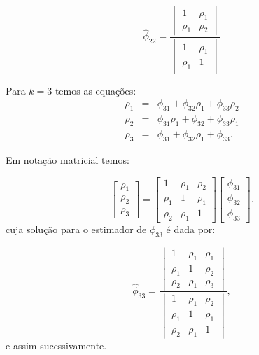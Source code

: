 \documentclass[
]{book}
\theoremstyle{definition}
\theoremstyle{definition}
\theoremstyle{definition}
\theoremstyle{remark}
\begin{document}
\begin{equation*}
\hat{\phi}_{22}=\frac{\begin{vmatrix}
1&\rho_1 \\
\rho_1&\rho_2
\end{vmatrix}}
{\begin{vmatrix}
1&\rho_1 \\
\rho_1&1
\end{vmatrix}}
\end{equation*}

Para \(k = 3\) temos as equações:
\begin{eqnarray*}
\rho_1 &=& \phi_{31}+ \phi_{32}\rho_1 + \phi_{33}\rho_2\\
\rho_2 &=& \phi_{31} \rho_1 + \phi_{32} + \phi_{33} \rho_1\\
\rho_3 &=& \phi_{31} + \phi_{32} \rho_1 + \phi_{33}.
\end{eqnarray*}

Em notação matricial temos:

\begin{equation*}
 \begin{bmatrix}
\rho_1 \\
\rho_2\\
\rho_3
\end{bmatrix}
=
 \begin{bmatrix}
1&\rho_1 &\rho_2\\
\rho_1&1 &\rho_1\\
\rho_2&\rho_1&1
\end{bmatrix}
 \begin{bmatrix}
\phi_{31}\\
\phi_{32}\\
\phi_{33}
\end{bmatrix}.
\end{equation*}
cuja solução para o estimador de \(\phi_{33}\) é dada por:

\begin{equation*}
\hat{\phi}_{33}=\frac{\begin{vmatrix}
1&\rho_1 &\rho_1\\
\rho_1&1 &\rho_2\\
\rho_2&\rho_1&\rho_3
\end{vmatrix}}
{\begin{vmatrix}
1&\rho_1 &\rho_2\\
\rho_1&1 &\rho_1\\
\rho_2&\rho_1&1
\end{vmatrix}},
\end{equation*}
e assim sucessivamente.
\end{document}

